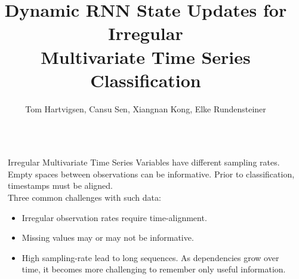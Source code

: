 \documentclass[final, 18pt]{beamer}
\title{Dynamic RNN State Updates for Irregular\\ Multivariate Time Series Classification}
\author{Tom Hartvigsen, Cansu Sen, Xiangnan Kong, Elke Rundensteiner}
\institute{Data Science, Worcester Polytechnic Institute}
\newlength{\sepwid}
\newlength{\onecolwid}
\begin{document}

\setlength{\belowcaptionskip}{2ex} %
\setlength\belowdisplayshortskip{2ex} %
\begin{frame} %

\vspace{-3.5cm} %

\begin{columns}[t] %

\begin{column}{\sepwid}\end{column} %

\begin{column}{\onecolwid} %

\begin{alertblock}{Irregular Multivariate Time Series}
Variables have different sampling rates. Empty spaces between observations can be informative. Prior to classification, timestamps must be aligned.
\\
Three common challenges with such data:
\begin{itemize}
    \item Irregular observation rates require time-alignment.
    \item Missing values may or may not be informative.
    \item High sampling-rate lead to long sequences. As dependencies grow over time, it becomes more challenging to remember only useful information.
\end{itemize}
\end{alertblock}


\end{column}
\end{columns}
\end{frame}
\end{document}
